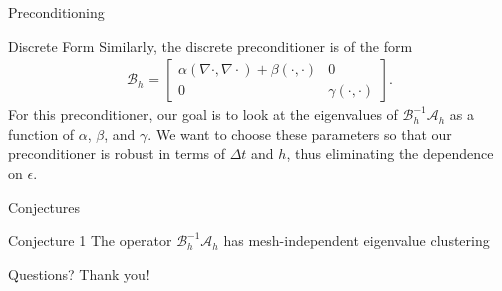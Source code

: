 \documentclass[presentation]{beamer}
\begin{document}
\begin{frame}{Preconditioning}
	\begin{block}{Discrete Form}
		Similarly, the discrete preconditioner is of the form
		\begin{gather*}
		\mathscr{B}_h=\begin{bmatrix}
		\alpha(\nabla \cdot, \nabla \cdot) + \beta(\cdot,\cdot) & 0 \\
		0 & \gamma(\cdot, \cdot)
		\end{bmatrix}.
		\end{gather*}
		For this preconditioner, our goal is to look at the eigenvalues of $\mathscr{B}_h^{-1}\mathscr{A}_h$ as a function of $\alpha$, $\beta$, and $\gamma$. We want to choose these parameters so that our preconditioner is robust in terms of $\Delta t$ and $h$, thus eliminating the dependence on $\epsilon$.
	\end{block}
\end{frame}

\begin{frame}{Conjectures}
	\begin{block}{Conjecture 1}
		The operator $\mathscr{B}^{-1}_h\mathscr{A}_h$ has mesh-independent eigenvalue clustering
	\end{block}
\end{frame}

\begin{frame}{Questions?}
	Thank you!
\end{frame}
\end{document}
